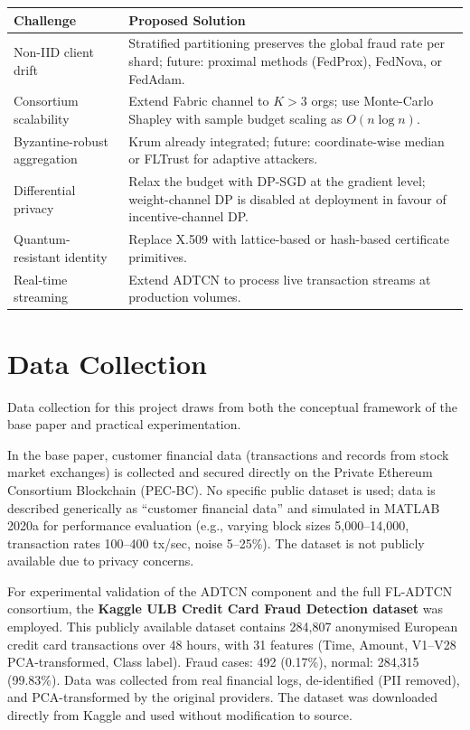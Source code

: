 \begin{center}
\label{tab:fl_adtcn_future}
\begin{tabular}{|p{3.9cm}|p{10.0cm}|}
\hline
\textbf{Challenge} & \textbf{Proposed Solution} \\ \hline
Non-IID client drift & Stratified partitioning preserves the global fraud rate per shard; future: proximal methods (FedProx), FedNova, or FedAdam. \\ \hline
Consortium scalability & Extend Fabric channel to $K > 3$ orgs; use Monte-Carlo Shapley with sample budget scaling as $O(n\log n)$. \\ \hline
Byzantine-robust aggregation & Krum already integrated; future: coordinate-wise median or FLTrust for adaptive attackers. \\ \hline
Differential privacy & Relax the budget with DP-SGD at the gradient level; weight-channel DP is disabled at deployment in favour of incentive-channel DP. \\ \hline
Quantum-resistant identity & Replace X.509 with lattice-based or hash-based certificate primitives. \\ \hline
Real-time streaming & Extend ADTCN to process live transaction streams at production volumes. \\ \hline
\end{tabular}
\end{center}

\section{Data Collection}

Data collection for this project draws from both the conceptual framework of the base paper and practical experimentation.

In the base paper, customer financial data (transactions and records from stock market exchanges) is collected and secured directly on the Private Ethereum Consortium Blockchain (PEC-BC). No specific public dataset is used; data is described generically as ``customer financial data'' and simulated in MATLAB 2020a for performance evaluation (e.g., varying block sizes 5,000–14,000, transaction rates 100–400 tx/sec, noise 5–25\%). The dataset is not publicly available due to privacy concerns.

For experimental validation of the ADTCN component and the full FL-ADTCN consortium, the \textbf{Kaggle ULB Credit Card Fraud Detection dataset} was employed. This publicly available dataset contains 284,807 anonymised European credit card transactions over 48 hours, with 31 features (Time, Amount, V1–V28 PCA-transformed, Class label). Fraud cases: 492 (0.17\%), normal: 284,315 (99.83\%). Data was collected from real financial logs, de-identified (PII removed), and PCA-transformed by the original providers. The dataset was downloaded directly from Kaggle and used without modification to source.

